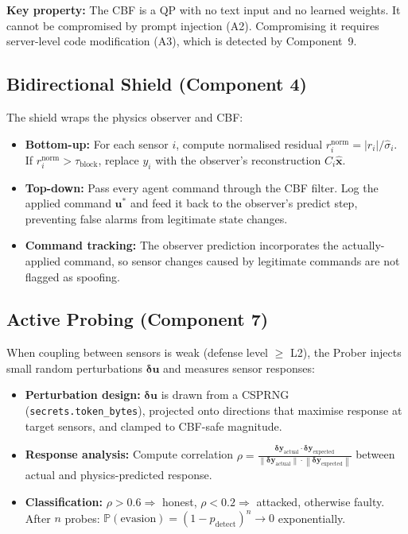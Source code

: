 \documentclass[journal]{IEEEtran}
\newcommand{\norm}[1]{\left\|#1\right\|}
\newcommand{\Prob}{\mathbb{P}}
\begin{document}
\textbf{Key property:} The CBF is a QP with no text input and no learned weights. It cannot be compromised by prompt injection (A2). Compromising it requires server-level code modification (A3), which is detected by Component~9.

\subsection{Bidirectional Shield (Component 4)}

The shield wraps the physics observer and CBF:

\begin{itemize}[leftmargin=*]
\item \textbf{Bottom-up:} For each sensor $i$, compute normalised residual $r_i^{\text{norm}} = |r_i| / \hat{\sigma}_i$. If $r_i^{\text{norm}} > \tau_{\text{block}}$, replace $y_i$ with the observer's reconstruction $C_i \hat{\bm{x}}$.

\item \textbf{Top-down:} Pass every agent command through the CBF filter. Log the applied command $\bm{u}^*$ and feed it back to the observer's predict step, preventing false alarms from legitimate state changes.

\item \textbf{Command tracking:} The observer prediction incorporates the actually-applied command, so sensor changes caused by legitimate commands are not flagged as spoofing.
\end{itemize}

\subsection{Active Probing (Component 7)}

When coupling between sensors is weak (defense level $\ge$ L2), the Prober injects small random perturbations $\bm{\delta u}$ and measures sensor responses:

\begin{itemize}[leftmargin=*]
\item \textbf{Perturbation design:} $\bm{\delta u}$ is drawn from a CSPRNG (\texttt{secrets.token\_bytes}), projected onto directions that maximise response at target sensors, and clamped to CBF-safe magnitude.

\item \textbf{Response analysis:} Compute correlation $\rho = \frac{\bm{\delta y}_{\text{actual}} \cdot \bm{\delta y}_{\text{expected}}}{\norm{\bm{\delta y}_{\text{actual}}} \cdot \norm{\bm{\delta y}_{\text{expected}}}}$ between actual and physics-predicted response.

\item \textbf{Classification:} $\rho > 0.6 \Rightarrow$ honest, $\rho < 0.2 \Rightarrow$ attacked, otherwise faulty. After $n$ probes: $\Prob(\text{evasion}) = (1 - p_{\text{detect}})^n \to 0$ exponentially.
\end{itemize}
\end{document}
